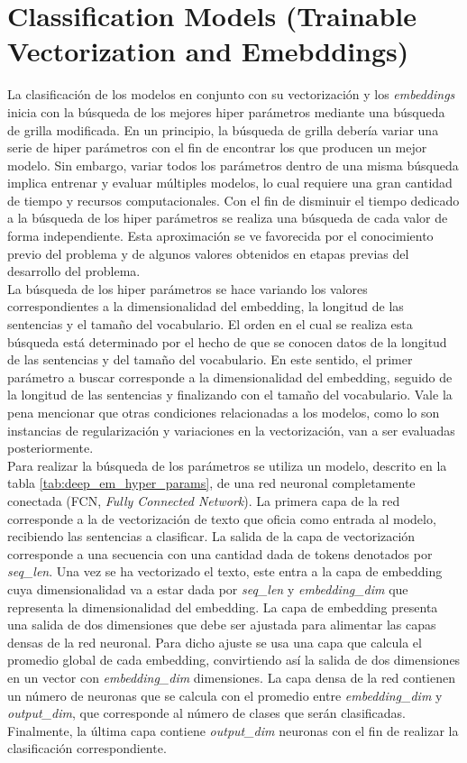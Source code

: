\newpage
\section{Classification Models (Trainable Vectorization and Emebddings)}
La clasificación de los modelos en conjunto con su vectorización y los \textit{embeddings} inicia con la búsqueda de los mejores hiper parámetros mediante una búsqueda de grilla modificada. En un principio, la búsqueda de grilla debería variar una serie de hiper parámetros con el fin de encontrar los que producen un mejor modelo. Sin embargo, variar todos los parámetros dentro de una misma búsqueda implica entrenar y evaluar múltiples modelos, lo cual requiere una gran cantidad de tiempo y recursos computacionales. Con el fin de disminuir el tiempo dedicado a la búsqueda de los hiper parámetros se realiza una búsqueda de cada valor de forma independiente. Esta aproximación se ve favorecida por el conocimiento previo del problema y de algunos valores obtenidos en etapas previas del desarrollo del problema. \\

La búsqueda de los hiper parámetros se hace variando los valores correspondientes a la dimensionalidad del embedding, la longitud de las sentencias y el tamaño del vocabulario. El orden en el cual se realiza esta búsqueda está determinado por el hecho de que se conocen datos de la longitud de las sentencias y del tamaño del vocabulario. En este sentido, el primer parámetro a buscar corresponde a la dimensionalidad del embedding, seguido de la longitud de las sentencias y finalizando con el tamaño del vocabulario. Vale la pena mencionar que otras condiciones relacionadas a los modelos, como lo son instancias de regularización y variaciones en la vectorización, van a ser evaluadas posteriormente. \\

Para realizar la búsqueda de los parámetros se utiliza un modelo, descrito en la tabla \ref{tab:deep_em_hyper_params}, de una red neuronal completamente conectada (FCN, \textit{Fully Connected Network}). La primera capa de la red corresponde a la de vectorización de texto que oficia como entrada al modelo, recibiendo las sentencias a clasificar. La salida de la capa de vectorización corresponde a una secuencia con una cantidad dada de tokens denotados por \textit{seq\_len}. Una vez se ha vectorizado el texto, este entra a la capa de embedding cuya dimensionalidad va a estar dada por \textit{seq\_len} y \textit{embedding\_dim} que representa la dimensionalidad del embedding. La capa de embedding presenta una salida de dos dimensiones que debe ser ajustada para alimentar las capas densas de la red neuronal. Para dicho ajuste se usa una capa que calcula el promedio global de cada embedding, convirtiendo así la salida de dos dimensiones en un vector con \textit{embedding\_dim} dimensiones. La capa densa de la red contienen un número de neuronas que se calcula con el promedio entre \textit{embedding\_dim} y \textit{output\_dim}, que corresponde al número de clases que serán clasificadas. Finalmente, la última capa contiene \textit{output\_dim} neuronas con el fin de realizar la clasificación correspondiente. \\

